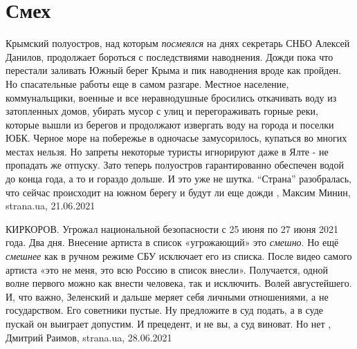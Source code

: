  
 
 
 
 
\chapter{Смех}
\label{sec:slova.smeh}

Крымский полуостров, над которым \emph{посмеялся} на днях секретарь СНБО
Алексей Данилов, продолжает бороться с последствиями наводнения.  Дожди пока
что перестали заливать Южный берег Крыма и пик наводнения вроде как пройден. Но
спасательные работы еще в самом разгаре.  Местное население, коммунальщики,
военные и все неравнодушные бросились откачивать воду из затопленных домов,
убирать мусор с улиц и перегораживать горные реки, которые вышли из берегов и
продолжают извергать воду на города и поселки ЮБК.  Черное море на побережье в
одночасье замусорилось, купаться во многих местах нельзя. Но запреты некоторые
туристы игнорируют даже в Ялте - не пропадать же отпуску.  Зато теперь
полуостров гарантированно обеспечен водой до конца года, а то и гораздо дольше.
И это уже не шутка.  \enquote{Страна} разобралась, что сейчас происходит на
южном берегу и будут ли еще дожди
, 
Максим Минин, strana.ua, 21.06.2021

КИРКОРОВ. Угрожал национальной безопасности с 25 июня по 27 июня 2021 года.
Два дня. Внесение артиста в список «угрожающий» это \emph{смешно}. Но ещё
\emph{смешнее} как в ручном режиме СБУ исключает его из списка.  После видео
самого артиста «это не меня, это всю Россию в список внесли».  Получается,
одной волне первого можно как внести человека, так и исключить.  Волей
августейшего.  И, что важно, Зеленский и дальше меряет себя личными
отношениями, а не государством. Его советники пустые.  Ну предложите в суд
подать, а в суде пускай он выиграет допустим. И прецедент, и не вы, а суд
виноват.  Но нет
, 
Дмитрий Раимов, strana.ua, 28.06.2021

